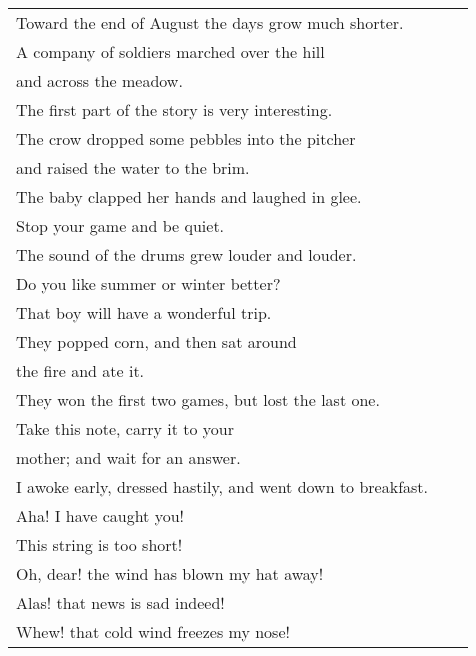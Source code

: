 \begin{tabular}{l|l l}
Toward the end of August the days grow much shorter. & &\\
 
A company of soldiers marched over the hill  &\\ \indent and across the meadow. & &\\
 
The first part of the story is very interesting. & &\\
 
The crow dropped some pebbles into the pitcher  &\\ \indent and raised the water to the brim. & &\\
 
The baby clapped her hands and laughed in glee. & &\\
 
Stop your game and be quiet. & &\\
 
The sound of the drums grew louder and louder. & &\\
 
Do you like summer or winter better? & &\\
 
That boy will have a wonderful trip. & &\\
 
They popped corn, and then sat around  &\\ \indent  the fire and ate it. & &\\
 
They won the first two games, but lost the last one. & &\\
 
Take this note, carry it to your  &\\ \indent mother; and wait for an answer. & &\\
 
I awoke early, dressed hastily, and went down to breakfast. & &\\
 
Aha! I have caught you! & &\\
 
This string is too short! & &\\
 
Oh, dear! the wind has blown my hat away! & &\\
 
Alas! that news is sad indeed! & &\\
 
Whew! that cold wind freezes my nose! & &\\
 

\end{tabular}
